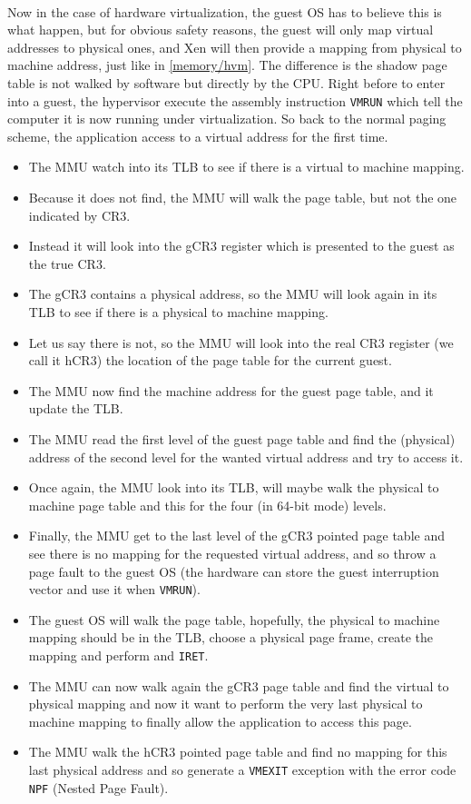 \paragraph{}
Now in the case of hardware virtualization, the guest OS has to believe this
is what happen, but for obvious safety reasons, the guest will only map
virtual addresses to physical ones, and Xen will then provide a mapping from
physical to machine address, just like in \ref{memory/hvm}.
The difference is the shadow page table is not walked by software but directly
by the CPU.
Right before to enter into a guest, the hypervisor execute the assembly
instruction \verb!VMRUN! which tell the computer it is now running under
virtualization.
So back to the normal paging scheme, the application access to a virtual
address for the first time.
\begin{itemize}
\item The MMU watch into its TLB to see if there is a virtual to machine
  mapping.
\item Because it does not find, the MMU will walk the page table, but not the
  one indicated by CR3.
\item Instead it will look into the gCR3 register which is presented to the
  guest as the true CR3.
\item The gCR3 contains a physical address, so the MMU will look again in its
  TLB to see if there is a physical to machine mapping.
\item Let us say there is not, so the MMU will look into the real CR3 register
  (we call it hCR3) the location of the page table for the current guest.
\item The MMU now find the machine address for the guest page table, and it
  update the TLB.
\item The MMU read the first level of the guest page table and find the
  (physical) address of the second level for the wanted virtual address and
  try to access it.
\item Once again, the MMU look into its TLB, will maybe walk the physical to
  machine page table and this for the four (in 64-bit mode) levels.
\item Finally, the MMU get to the last level of the gCR3 pointed page table
  and see there is no mapping for the requested virtual address, and so
  throw a page fault to the guest OS (the hardware can store the guest
  interruption vector and use it when \verb!VMRUN!).
\item The guest OS will walk the page table, hopefully, the physical to machine
  mapping should be in the TLB, choose a physical page frame, create the
  mapping and perform and \verb!IRET!.
\item The MMU can now walk again the gCR3 page table and find the virtual
  to physical mapping and now it want to perform the very last physical to
  machine mapping to finally allow the application to access this page.
\item The MMU walk the hCR3 pointed page table and find no mapping for this
  last physical address and so generate a \verb!VMEXIT! exception with the
  error code \verb!NPF! (Nested Page Fault).
\end{itemize}

